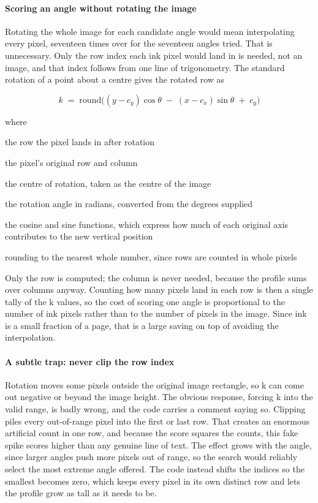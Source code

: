 \paragraph{Scoring an angle without rotating the image}
Rotating the whole image for each candidate angle would mean interpolating every pixel, seventeen times over for the seventeen angles tried. That is unnecessary. Only the row index each ink pixel would land in is needed, not an image, and that index follows from one line of trigonometry. The standard rotation of a point about a centre gives the rotated row as


\begin{equation}
k \;=\; \mathrm{round}\Big( (y - c_y)\cos\theta \;-\; (x - c_x)\sin\theta \;+\; c_y \Big)
\end{equation}

\noindent where
\begin{description}[leftmargin=2.4em,style=nextline,font=\normalfont\ttfamily]\setlength\itemsep{1pt}
  \item[{$k$}] \normalfont the row the pixel lands in after rotation
  \item[{$y,\,x$}] \normalfont the pixel's original row and column
  \item[{$c_y,\,c_x$}] \normalfont the centre of rotation, taken as the centre of the image
  \item[{$\theta$}] \normalfont the rotation angle in radians, converted from the degrees supplied
  \item[{$\cos,\,\sin$}] \normalfont the cosine and sine functions, which express how much of each original axis contributes to the new vertical position
  \item[{$\mathrm{round}$}] \normalfont rounding to the nearest whole number, since rows are counted in whole pixels
\end{description}
Only the row is computed; the column is never needed, because the profile sums over columns anyway. Counting how many pixels land in each row is then a single tally of the k values, so the cost of scoring one angle is proportional to the number of ink pixels rather than to the number of pixels in the image. Since ink is a small fraction of a page, that is a large saving on top of avoiding the interpolation.


\paragraph{A subtle trap: never clip the row index}
Rotation moves some pixels outside the original image rectangle, so k can come out negative or beyond the image height. The obvious response, forcing k into the valid range, is badly wrong, and the code carries a comment saying so. Clipping piles every out-of-range pixel into the first or last row. That creates an enormous artificial count in one row, and because the score squares the counts, this fake spike scores higher than any genuine line of text. The effect grows with the angle, since larger angles push more pixels out of range, so the search would reliably select the most extreme angle offered. The code instead shifts the indices so the smallest becomes zero, which keeps every pixel in its own distinct row and lets the profile grow as tall as it needs to be.


